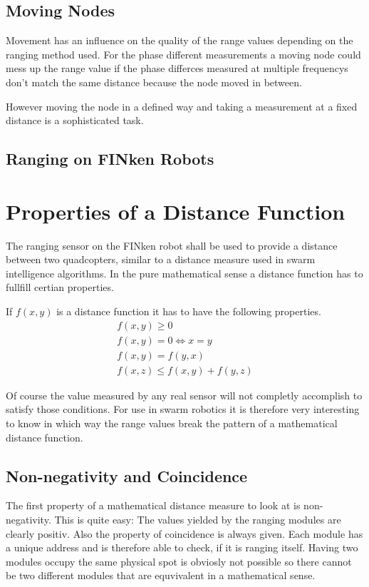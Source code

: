\subsection{Moving Nodes}
Movement has an influence on the quality of the range values depending on the ranging method used.
For the phase different measurements a moving node could mess up the range value if the phase differces measured at multiple frequencys don't match the same distance because the node moved in between. 

However moving the node in a defined way and taking a measurement at a fixed distance is a sophisticated task.

\subsection{Ranging on FINken Robots}

\section{Properties of a Distance Function}
The ranging sensor on the FINken robot shall be used to provide a distance between two quadcopters, similar to a distance measure used in swarm intelligence algorithms.
In the pure mathematical sense a distance function has to fullfill certian properties.

If $f(x, y)$ is a distance function it has to have the following properties.
\begin{eqnarray}
f(x, y) \ge 0 \\
f(x, y) = 0 \iff x = y \\ 
f(x, y) = f(y, x) \\ 
f(x, z) \le f(x, y) + f(y, z)
\end{eqnarray}

Of course the value measured by any real sensor will not completly accomplish to satisfy those conditions.
For use in swarm robotics it is therefore very interesting to know in which way the range values break the pattern of a mathematical distance function.

\subsection{Non-negativity and Coincidence}

The first property of a mathematical distance measure to look at is non-negativity. This is quite easy: The values yielded by the ranging modules are clearly positiv.
Also the property of coincidence is always given.
Each module has a unique address and is therefore able to check, if it is ranging itself.
Having two modules occupy the same physical spot is obviosly not possible so there cannot be two different modules that are equvivalent in a mathematical sense.

